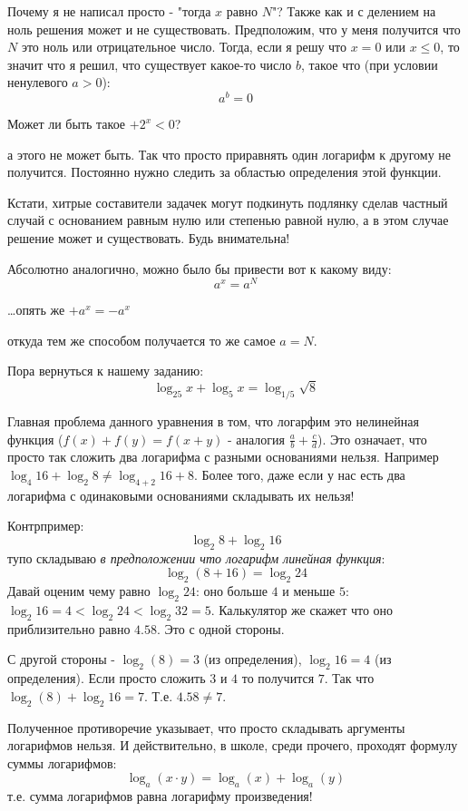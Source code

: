 \documentclass{article}
\begin{document}
Почему я не написал просто - "тогда $x$ равно $N$"? Также как и с делением на ноль решения может и не существовать. Предположим, что у меня получится что $N$ это ноль или отрицательное число. Тогда, если я решу что $x=0$ или $x\le{}0$, то значит что я решил, что существует какое-то число $b$, такое что (при условии ненулевого $a>0$):
$$a^b=0$$

Может ли быть такое $+2^x<0$?

а этого не может быть. Так что просто приравнять один логарифм к другому не получится. Постоянно нужно следить за областью определения этой функции.

Кстати, хитрые составители задачек могут подкинуть подлянку сделав частный случай с основанием равным нулю или степенью равной нулю, а в этом случае решение может и существовать. Будь внимательна!

Абсолютно аналогично, можно было бы привести вот к какому виду:
$$a^x=a^N$$

\ldots{}опять же $+a^x=-a^x$

откуда тем же способом получается то же самое $a=N$.

Пора вернуться к нашему заданию:
$$\log_{25}{x}+\log_{5}{x}=\log_{1/5}{\sqrt{8}}$$

Главная проблема данного уравнения в том, что логарфим это нелинейная функция ($f(x)+f(y)=f(x+y)$ - аналогия $\frac{a}{b}+\frac{c}{d}$). Это означает, что просто так сложить два логарифма с разными основаниями нельзя. Например $\log_{4}{16}+\log_{2}{8} \ne \log_{4+2}{16+8}$. Более того, даже если у нас есть два логарифма с одинаковыми основаниями складывать их нельзя! 

Контрпример:
$$\log_{2}{8} + \log_{2}{16}$$
тупо складываю \textit{в предположении что логарифм линейная функция}:
$$\log_{2}{(8+16)} = \log_{2}{24}$$
Давай оценим чему равно $\log_{2}{24}$: оно больше $4$ и меньше $5$: $\log_{2}{16}=4 < \log_{2}{24} < \log_{2}{32}=5$. Калькулятор же скажет что оно приблизительно равно $4.58$. Это с одной стороны.

С другой стороны - $\log_{2}(8)=3$ (из определения), $\log_{2}{16}=4$ (из определения). Если просто сложить $3$ и $4$ то получится $7$. Так что $\log_{2}(8)+\log_{2}{16} = 7$. Т.е. $4.58 \ne 7$.

Полученное противоречие указывает, что просто складывать аргументы логарифмов нельзя. И действительно, в школе, среди прочего, проходят формулу суммы логарифмов:
$$\log_{a}{(x\cdot{}y)} = \log_{a}{(x)} + \log_{a}{(y)}$$
т.е. сумма логарифмов равна логарифму произведения!
\end{document}
